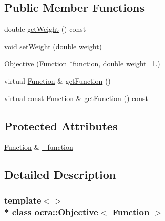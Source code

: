 \subsection*{Public Member Functions}
\begin{DoxyCompactItemize}
\item 
double \hyperlink{classocra_1_1Objective_3_01Function_01_4_a0d9de70de3a0de5a47fb5eb66c8727b9}{get\+Weight} () const 
\item 
void \hyperlink{classocra_1_1Objective_3_01Function_01_4_a41fa85e1e535bb935f20312e7b398a26}{set\+Weight} (double weight)
\end{DoxyCompactItemize}
{\bf }\par
\begin{DoxyCompactItemize}
\item 
\hyperlink{classocra_1_1Objective_3_01Function_01_4_a5a469564d2691823b5e9e951c975b66c}{Objective} (\hyperlink{classocra_1_1Function}{Function} $\ast$function, double weight=1.)
\end{DoxyCompactItemize}

{\bf }\par
\begin{DoxyCompactItemize}
\item 
virtual \hyperlink{classocra_1_1Function}{Function} \& \hyperlink{classocra_1_1Objective_3_01Function_01_4_add81891f4afd477c85ddc326a207e8be}{get\+Function} ()
\item 
virtual const \hyperlink{classocra_1_1Function}{Function} \& \hyperlink{classocra_1_1Objective_3_01Function_01_4_a37458acf9f2fdcbd79eec604181ae869}{get\+Function} () const 
\end{DoxyCompactItemize}

\subsection*{Protected Attributes}
\begin{DoxyCompactItemize}
\item 
\hyperlink{classocra_1_1Function}{Function} \& \hyperlink{classocra_1_1Objective_3_01Function_01_4_a68d84f4b46839664695f62c12ed8092d}{\+\_\+function}
\end{DoxyCompactItemize}


\subsection{Detailed Description}
\subsubsection*{template$<$$>$\\*
class ocra\+::\+Objective$<$ Function $>$}



